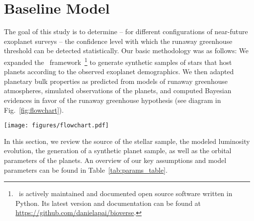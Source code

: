\documentclass[twocolumn,twocolappendix]{aastex631}
\begin{document}
\section{Baseline Model}\label{sec:met_baseline}
The goal of this study is to determine -- for different configurations of near-future exoplanet surveys -- the confidence level with which the runaway greenhouse threshold can be detected statistically. %
Our basic methodology was as follows:
We expanded the \bioverse\ framework~\citep{Bixel2020,Bixel2021}\footnote{\bioverse\ is actively maintained and documented open source software written in Python. Its latest version and documentation can be found at \url{https://github.com/danielapai/bioverse}.} to generate synthetic samples of stars that host planets according to the observed exoplanet demographics.
We then adapted planetary bulk properties as predicted from models of runaway greenhouse atmospheres, simulated observations of the planets, and computed Bayesian evidences in favor of the runaway greenhouse hypothesis (see diagram in Fig.~\ref{fig:flowchart}).
\begin{figure*}
    \begin{centering}
        \texttt{[image: figures/flowchart.pdf]}
        \caption{Workflow of our hypothesis testing with \bioverse. First, we generate a sample of stars and populate them with planets based on \kepler\ demographics.
            A fraction of them are then assigned a runaway greenhouse climate based on the model described in Sect.~\ref{sec:met_rghmodel}.
        We then simulate an exoplanet survey, whereby selection effects and detection biases are introduced. Finally, we test the runaway greenhouse hypothesis based on data from the survey simulation.
        By iterating through these steps, we compute the statistical power of testing the hypothesis for different survey designs.}
        \label{fig:flowchart}
    \end{centering}
\end{figure*}
In this section, we review the source of the stellar sample, the modeled luminosity evolution, the generation of a synthetic planet sample, as well as the orbital parameters of the planets.
An overview of our key assumptions and model parameters can be found in Table~\ref{tab:params_table}.
\end{document}
